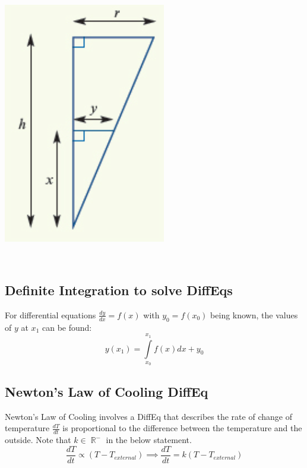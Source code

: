 \documentclass[a4paper,twoside,10pt]{article}
\DeclareMathOperator\R{\mathbb{R}}
\newenvironment{example}[1]{%
	\mbox{}\\\tcolorbox[beamer,breakable,%
		title=Example: #1,standard jigsaw,opacityback=0, colframe=blue!75!black, boxrule=2pt]}{\endtcolorbox\mbox{}\\}
\begin{document}
\begin{example}{Inverted Cone}
\begin{minipage}{0.2\textwidth}
					\includegraphics[width=\linewidth]{relatedratescone.png}
				\end{minipage}
				
			\end{example}
			
		\subsection{Definite Integration to solve DiffEqs}
			For differential equations $\frac{dy}{dx}=f(x)$ with $y_0=f(x_0)$ being known, the values of $y$ at $x_1$ can be found:
			\[
				y(x_1)=\int\limits_{x_0}^{x_1}f(x)dx+y_0
			\]
			
		
		\subsection{Newton's Law of Cooling DiffEq} Newton's Law of Cooling involves a DiffEq that describes the rate of change of temperature $\frac{dT}{dt}$ is proportional to the difference between the temperature and the outside. Note that $k\in\R^-$ in the below statement.
		\[
			\frac{dT}{dt}\propto (T-T_{external})\implies\frac{dT}{dt}=k(T-T_{external})
		\]
		
\end{document}

